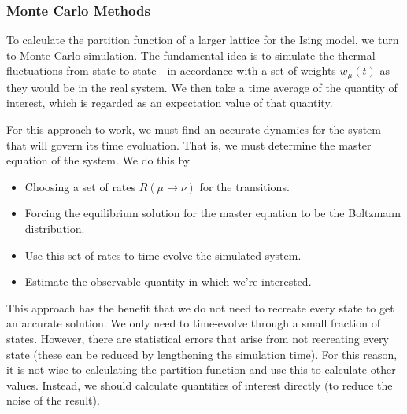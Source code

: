 \documentclass{article}
\begin{document}
\subsubsection{Monte Carlo Methods}
To calculate the partition function of a larger lattice for the Ising model, we turn to
Monte Carlo simulation. The fundamental idea is to simulate the thermal fluctuations from state
to state - in accordance with a set of weights $w_{\mu}(t)$ as they would be in the real system.
We then take a time average of the quantity of interest, which is regarded as an expectation value
of that quantity.

For this approach to work, we must find an accurate dynamics for the system that will govern its
time evoluation. That is, we must determine the master equation of the system. We do this by
\begin{itemize}
\item Choosing a set of rates $R(\mu \rightarrow \nu)$ for the transitions.
\item Forcing the equilibrium solution for the master equation to be the Boltzmann distribution.
\item Use this set of rates to time-evolve the simulated system.
\item Estimate the observable quantity in which we're interested.
\end{itemize}

This approach has the benefit that we do not need to recreate every state to get an accurate solution.
We only need to time-evolve through a small fraction of states. However, there are statistical errors
that arise from not recreating every state (these can be reduced by lengthening the simulation time).
For this reason, it is not wise to calculating the partition function and use this to calculate other
values. Instead, we should calculate quantities of interest directly (to reduce the noise of the result).
\end{document}
